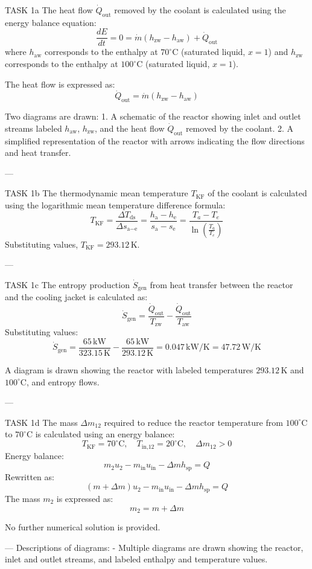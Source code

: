 TASK 1a  
The heat flow \( \dot{Q}_{\text{out}} \) removed by the coolant is calculated using the energy balance equation:  
\[
\frac{dE}{dt} = 0 = \dot{m} (h_{\text{zw}} - h_{\text{aw}}) + \dot{Q}_{\text{out}}
\]  
where \( h_{\text{aw}} \) corresponds to the enthalpy at \( 70^\circ\text{C} \) (saturated liquid, \( x = 1 \)) and \( h_{\text{zw}} \) corresponds to the enthalpy at \( 100^\circ\text{C} \) (saturated liquid, \( x = 1 \)).  

The heat flow is expressed as:  
\[
\dot{Q}_{\text{out}} = \dot{m} (h_{\text{zw}} - h_{\text{aw}})
\]  

Two diagrams are drawn:  
1. A schematic of the reactor showing inlet and outlet streams labeled \( h_{\text{aw}} \), \( h_{\text{zw}} \), and the heat flow \( \dot{Q}_{\text{out}} \) removed by the coolant.  
2. A simplified representation of the reactor with arrows indicating the flow directions and heat transfer.  

---

TASK 1b  
The thermodynamic mean temperature \( T_{\text{KF}} \) of the coolant is calculated using the logarithmic mean temperature difference formula:  
\[
T_{\text{KF}} = \frac{\Delta T_{\text{ds}}}{\Delta s_{\text{a} - \text{e}}} = \frac{h_{\text{a}} - h_{\text{e}}}{s_{\text{a}} - s_{\text{e}}} = \frac{T_a - T_e}{\ln \left( \frac{T_a}{T_e} \right)}
\]  
Substituting values, \( T_{\text{KF}} = 293.12 \, \text{K} \).  

---

TASK 1c  
The entropy production \( \dot{S}_{\text{gen}} \) from heat transfer between the reactor and the cooling jacket is calculated as:  
\[
\dot{S}_{\text{gen}} = \frac{\dot{Q}_{\text{out}}}{T_{\text{zw}}} - \frac{\dot{Q}_{\text{out}}}{T_{\text{aw}}}
\]  
Substituting values:  
\[
\dot{S}_{\text{gen}} = \frac{65 \, \text{kW}}{323.15 \, \text{K}} - \frac{65 \, \text{kW}}{293.12 \, \text{K}} = 0.047 \, \text{kW/K} = 47.72 \, \text{W/K}
\]  

A diagram is drawn showing the reactor with labeled temperatures \( 293.12 \, \text{K} \) and \( 100^\circ\text{C} \), and entropy flows.  

---

TASK 1d  
The mass \( \Delta m_{12} \) required to reduce the reactor temperature from \( 100^\circ\text{C} \) to \( 70^\circ\text{C} \) is calculated using an energy balance:  
\[
T_{\text{KF}} = 70^\circ\text{C}, \quad T_{\text{in,12}} = 20^\circ\text{C}, \quad \Delta m_{12} > 0
\]  
Energy balance:  
\[
m_2 u_2 - m_{\text{in}} u_{\text{in}} - \Delta m h_{\text{sp}} = Q
\]  
Rewritten as:  
\[
(m + \Delta m) u_2 - m_{\text{in}} u_{\text{in}} - \Delta m h_{\text{sp}} = Q
\]  
The mass \( m_2 \) is expressed as:  
\[
m_2 = m + \Delta m
\]  

No further numerical solution is provided.  

---  
Descriptions of diagrams:  
- Multiple diagrams are drawn showing the reactor, inlet and outlet streams, and labeled enthalpy and temperature values.  
